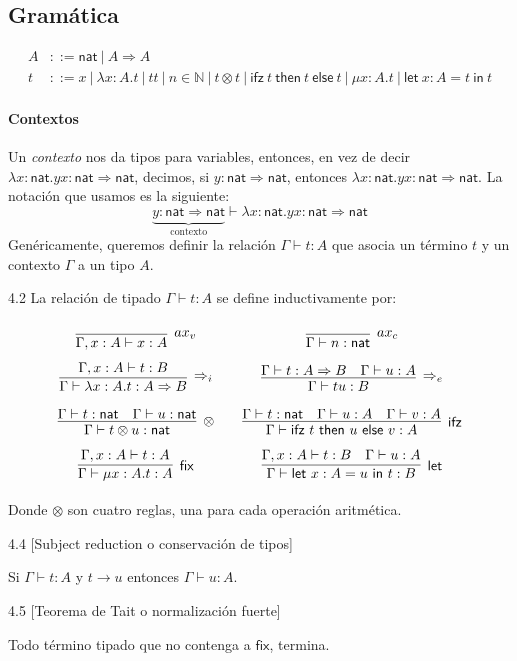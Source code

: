\documentclass[twoside,a4paper,12pt]{article}
\theoremstyle{definition}
\theoremstyle{remark}
\newcommand\ifz[3]{\ensuremath{\mathsf{ifz~}#1\mathsf{~then~}#2\mathsf{~else~}#3}}
\newcommand\fun[2]{\ensuremath{\lambda {#1}{.}{#2}}}
\newcommand\fix[2]{\ensuremath{\mathsf{\mu}#1.#2}}
\newcommand\letl[3]{\ensuremath{\mathsf{let~}#1=#2\mathsf{~in~}#3}}
\newcommand\nat{\ensuremath{\mathsf{nat}}}
\begin{document}
\subsection*{Gramática}

\begin{align*}
  A &::= \nat~|~A\Rightarrow A\\
  t &::= x~|~\fun{x:A}t~|~tt~|~n\in\mathbb N~|~t\otimes t~|~\ifz ttt~|~\fix{x:A}t~|~\letl{x:A}tt
\end{align*}

\paragraph{Contextos}
Un \emph{contexto} nos da tipos para variables, entonces,
en vez de decir $\fun{x:\nat}{yx}:\nat\Rightarrow\nat$, decimos, si
$y:\nat\Rightarrow\nat$, entonces $\fun{x:\nat}{yx}:\nat\Rightarrow\nat$. La
notación que usamos es la siguiente:
\[
  \underbrace{y:\nat\Rightarrow\nat}_{\textrm{contexto}}\vdash\fun{x:\nat}{yx}:\nat\Rightarrow\nat
\]
Genéricamente, queremos definir la relación $\Gamma\vdash t:A$ que asocia un
término $t$ y un contexto $\Gamma$ a un tipo $A$.

\begin{definicion}{4.2}
  \label{def:ST}
  La relación de tipado $\Gamma\vdash t:A$ se define inductivamente por:
  \[\arraycolsep=10pt\def\arraystretch{2.6}
    \begin{array}{cc}
      \infer[ax_v]
      {\Gamma,x:A\vdash x:A}
      {}
      &
        \infer[ax_c]
        {\Gamma\vdash n:\nat}
        {}
      \\
      \infer[\Rightarrow_i]
      {\Gamma\vdash\fun{x:A}t:A\Rightarrow B}
      {\Gamma,x:A\vdash t:B}
      &
        \infer[\Rightarrow_e]
        {\Gamma\vdash tu:B}
        {\Gamma\vdash t:A\Rightarrow B & \Gamma\vdash u:A}
      \\
      \infer[\otimes]
      {\Gamma\vdash t\otimes u:\nat}
      {\Gamma\vdash t:\nat & \Gamma\vdash u:\nat}
      &
        \infer[\mathsf{ifz}]
        {\Gamma\vdash\ifz tuv:A}
        {\Gamma\vdash t:\nat & \Gamma\vdash u:A & \Gamma\vdash v:A}
      \\
      \infer[\mathsf{fix}]
      {\Gamma\vdash\fix{x:A}t:A}
      {\Gamma,x:A\vdash t:A}
      &
        \infer[\mathsf{let}]
        {\Gamma\vdash\letl{x:A}ut:B}
        {\Gamma,x:A\vdash t:B & \Gamma\vdash u:A}
    \end{array}
  \]
  Donde $\otimes$ son cuatro reglas, una para cada operación aritmética.
\end{definicion}

\begin{teorema}{4.4}
  [Subject reduction o conservación de tipos]
  \label{thm:SR}
  ~

  Si $\Gamma\vdash t:A$ y $t\to u$ entonces $\Gamma\vdash u:A$.
\end{teorema}

\begin{teorema}{4.5}
  [Teorema de Tait o normalización fuerte]
  \label{thm:SN}
  ~

  Todo término tipado que no contenga a $\mathsf{fix}$, termina.
\end{teorema}
\end{document}
